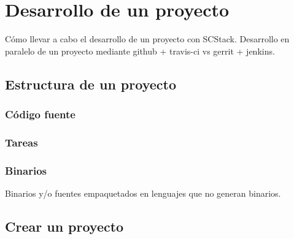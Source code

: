 %
% 

\chapter{Desarrollo de un proyecto}
\label{chap:desarrollo}

\par Cómo llevar a cabo el desarrollo de un proyecto con SCStack. Desarrollo en paralelo de un proyecto mediante github + travis-ci vs gerrit + jenkins.

\section{Estructura de un proyecto}
\label{sec:estructura}


\subsection{Código fuente}
\label{sub:codigo-fuente}


\subsection{Tareas}
\label{sub:tareas}


\subsection{Binarios}
\label{sub:binarios}

Binarios y/o fuentes empaquetados en lenguajes que no generan binarios.


\section{Crear un proyecto}
\label{sec:crear-pryecto}

